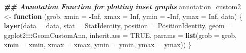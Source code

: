 \documentclass[
]{article}
\newenvironment{Shaded}{\begin{snugshade}}{\end{snugshade}}
\newcommand{\AttributeTok}[1]{\textcolor[rgb]{0.13,0.29,0.53}{#1}}
\newcommand{\ConstantTok}[1]{\textcolor[rgb]{0.56,0.35,0.01}{#1}}
\newcommand{\ControlFlowTok}[1]{\textcolor[rgb]{0.13,0.29,0.53}{\textbf{#1}}}
\newcommand{\DocumentationTok}[1]{\textcolor[rgb]{0.56,0.35,0.01}{\textbf{\textit{#1}}}}
\newcommand{\FunctionTok}[1]{\textcolor[rgb]{0.13,0.29,0.53}{\textbf{#1}}}
\newcommand{\NormalTok}[1]{#1}
\newcommand{\OtherTok}[1]{\textcolor[rgb]{0.56,0.35,0.01}{#1}}
\newcommand{\SpecialCharTok}[1]{\textcolor[rgb]{0.81,0.36,0.00}{\textbf{#1}}}
\begin{document}
\begin{Shaded}
\begin{Highlighting}[]
\DocumentationTok{\#\# Annotation Function for plotting inset graphs}
\NormalTok{annotation\_custom2 }\OtherTok{\textless{}{-}} \ControlFlowTok{function}\NormalTok{ (grob, }\AttributeTok{xmin =} \SpecialCharTok{{-}}\ConstantTok{Inf}\NormalTok{, }\AttributeTok{xmax =} \ConstantTok{Inf}\NormalTok{, }\AttributeTok{ymin =} \SpecialCharTok{{-}}\ConstantTok{Inf}\NormalTok{, }\AttributeTok{ymax =} \ConstantTok{Inf}\NormalTok{, data) }
\NormalTok{\{}
  \FunctionTok{layer}\NormalTok{(}\AttributeTok{data =}\NormalTok{ data, }\AttributeTok{stat =}\NormalTok{ StatIdentity, }\AttributeTok{position =}\NormalTok{ PositionIdentity, }
        \AttributeTok{geom =}\NormalTok{ ggplot2}\SpecialCharTok{:::}\NormalTok{GeomCustomAnn,}
        \AttributeTok{inherit.aes =} \ConstantTok{TRUE}\NormalTok{, }\AttributeTok{params =} \FunctionTok{list}\NormalTok{(}\AttributeTok{grob =}\NormalTok{ grob, }
                                          \AttributeTok{xmin =}\NormalTok{ xmin, }\AttributeTok{xmax =}\NormalTok{ xmax, }
                                          \AttributeTok{ymin =}\NormalTok{ ymin, }\AttributeTok{ymax =}\NormalTok{ ymax))}
\NormalTok{\}}


\end{Highlighting}
\end{Shaded}
\end{document}
